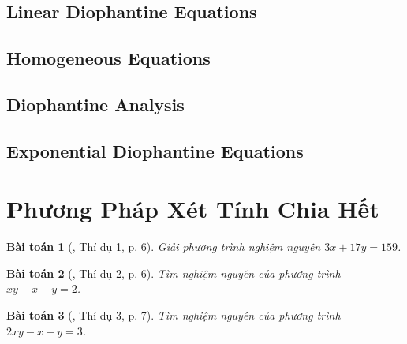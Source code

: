\documentclass{article}
\numberwithin{equation}{section}
\newtheorem{baitoan}{Bài toán}[section]
\begin{document}
\subsection{Linear Diophantine Equations}

\subsection{Homogeneous Equations}

\subsection{Diophantine Analysis}

\subsection{Exponential Diophantine Equations}


\section{Phương Pháp Xét Tính Chia Hết}

\begin{baitoan}[\cite{Binh_PTNN}, Thí dụ 1, p. 6]
	Giải phương trình nghiệm nguyên $3x + 17y = 159$.
\end{baitoan}

\begin{baitoan}[\cite{Binh_PTNN}, Thí dụ 2, p. 6]
	Tìm nghiệm nguyên của phương trình $xy - x - y = 2$.
\end{baitoan}

\begin{baitoan}[\cite{Binh_PTNN}, Thí dụ 3, p. 7]
	Tìm nghiệm nguyên của phương trình $2xy - x + y = 3$.
\end{baitoan}


\printbibliography[heading=bibintoc]
	
\end{document}
